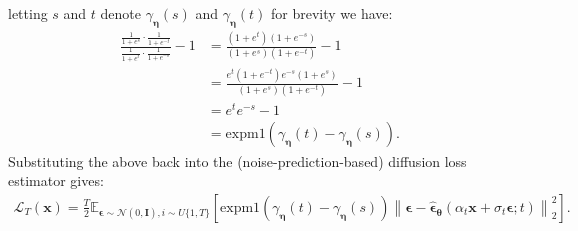 %
letting $s$ and $t$ denote $\gamma_{\boldsymbol{\eta}}(s)$ and $\gamma_{\boldsymbol{\eta}}(t)$ for brevity we have:
%
\begin{align}
    \frac{\frac{1}{1+e^s} \cdot \frac{1}{1+e^{-t}}}{\frac{1}{1+e^t} \cdot \frac{1}{1+e^{-s}}} - 1 & = \frac{\left(1 + e^t\right)\left(1 + e^{-s}\right)}{\left(1 + e^{s}\right)\left(1 + e^{-t}\right)} - 1
    \\[5pt] & = \frac{e^t\left(1 + e^{-t}\right)e^{-s}\left(1 + e^{s}\right)}{\left(1 + e^{s}\right)\left(1 + e^{-t}\right)} - 1
    \\[5pt] & = e^te^{-s} - 1  
    \\[5pt] & = \mathrm{expm1}\left(\gamma_{\boldsymbol{\eta}}(t) - \gamma_{\boldsymbol{\eta}}(s) \right). \label{eq: e_constant}
\end{align}
%
Substituting the above back into the (noise-prediction-based) diffusion loss estimator gives:
%
\begin{align}
    \mathcal{L}_T(\mathbf{x}) = \frac{T}{2}\mathbb{E}_{\boldsymbol{\epsilon} \sim \mathcal{N}(0,\mathbf{I}),i \sim U{\{1,T\}}}\left[\mathrm{expm1}\left(\gamma_{\boldsymbol{\eta}}(t) - \gamma_{\boldsymbol{\eta}}(s) \right)\left\| \boldsymbol{\epsilon} - \hat{\boldsymbol{\epsilon}}_{\boldsymbol{\theta}}(\alpha_t \mathbf{x} + \sigma_t\boldsymbol{\epsilon};t) \right\|^2_2 \right].
\end{align}
%

